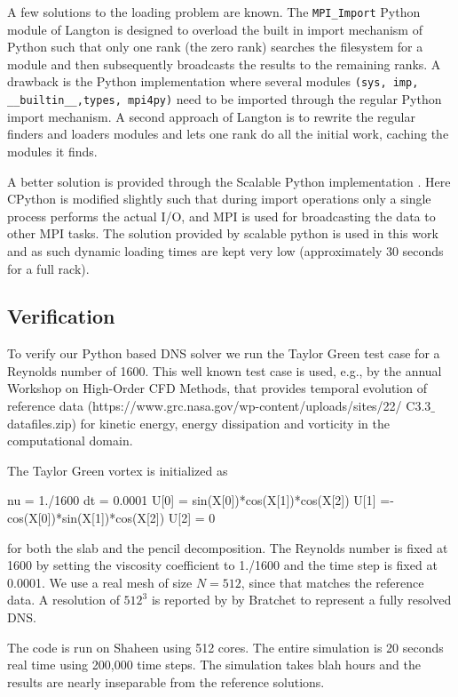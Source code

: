 \documentclass[11pt, oneside]{article}
\newcommand{\inpyth}{\lstinline[style=pythonstyle, basicstyle=\ttfamily]} %[]%
\begin{document}
A few solutions to the loading problem are known. The \inpyth{MPI_Import} Python module of Langton \cite{mpi_import} is designed to overload the built in import mechanism of Python such that only one rank (the zero rank) searches the filesystem for a module and then subsequently broadcasts the results to the remaining ranks. A drawback is the Python implementation where several modules \inpyth{(sys, imp, __builtin__,types, mpi4py)} need to be imported through the regular Python import mechanism. A second approach of Langton is to rewrite the regular finders and loaders modules and lets one rank do all the initial work, caching the modules it finds. 

A better solution is provided through the Scalable Python implementation \cite{scalablepython, Enkovaara201117}. Here CPython is modified slightly such that during import operations only a single process performs the actual I/O, and MPI is used for broadcasting the data to other MPI tasks. The solution provided by scalable python is used in this work and as such dynamic loading times are kept very low (approximately 30 seconds for a full rack).

\subsection{Verification}
To verify our Python based DNS solver we run the Taylor Green test case for a Reynolds number of 1600. This well known test case is used, e.g., by the annual Workshop on High-Order CFD Methods, that provides temporal evolution of reference data (https://www.grc.nasa.gov/wp-content/uploads/sites/22/ C3.3$\_$datafiles.zip) for kinetic energy, energy dissipation and vorticity in the computational domain.

The Taylor Green vortex is initialized as
\begin{python}
nu = 1./1600
dt = 0.0001
U[0] = sin(X[0])*cos(X[1])*cos(X[2])
U[1] =-cos(X[0])*sin(X[1])*cos(X[2])
U[2] = 0 
\end{python}
for both the slab and the pencil decomposition. The Reynolds number is fixed at 1600 by setting the viscosity coefficient to 1./1600 and the time step is fixed at 0.0001. We use a real mesh of size $N=512$, since that matches the reference data. A resolution of $512^3$ is reported by by Bratchet \cite{brachet1991direct} to represent a fully resolved DNS.

The code is run on Shaheen using 512 cores. The entire simulation is 20 seconds real time using 200,000 time steps. The simulation takes blah hours and the results are nearly inseparable from the reference solutions.
\end{document}
